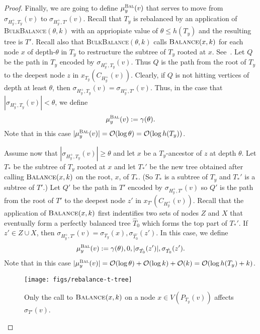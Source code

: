 \documentclass[kpfonts]{patmorin}
\newcommand{\Oh}{\mathcal{O}}
\let\leq\leqslant
\let\geq\geqslant
\begin{document}
\begin{proof}
  Finally, we are going to define $\mu_y^{\textsc{Bal}}(v)$ that serves to move from $\sigma_{H^+_{y},T_{y}}(v)$ to $\sigma_{H^+_{y},T'}(v)$. 
  Recall that $T_y$ is rebalanced by an application of \textsc{BulkBalance}$(\theta,k)$ with an appriopiate value of $\theta \leq h(T_y)$ and the resulting tree is $T'$.
  Recall also that \textsc{BulkBalance}$(\theta,k)$ calls $\textsc{Balance}(x,k)$ for each node $x$ of depth-$\theta$ in $T_y$ to restructure the subtree of $T_y$ rooted at $x$. See~. 
  Let $Q$ be the path in $T_y$ encoded by $\sigma_{H^+_{y},T_{y}}(v)$. 
  Thus $Q$ is the path from the root of $T_y$ to the deepest node $z$ in $x_{T_y}(C_{H^+_{y}}(v))$.
  Clearly, if $Q$ is not hitting vertices of depth at least $\theta$, then $\sigma_{H^+_{y},T_{y}}(v)=\sigma_{H^+_{y},T'}(v)$.
  Thus, in the case that $|\sigma_{H^+_{y},T_{y}}(v)| < \theta$, we define
  \[
  \mu_y^{\textsc{Bal}}(v) := \gamma(\theta).
  \]
  Note that in this case $|\mu_y^{\textsc{Bal}}(v)| = \Oh(\log \theta) = \Oh(\log h(T_y))$.

  Assume now that $|\sigma_{H^+_{y},T_{y}}(v)| \geq \theta$ and let $x$ be a $T_y$-ancestor of $z$ at depth $\theta$. 
  Let $T_*$ be the subtree of $T_y$ rooted at $x$ and let $T_*'$ be the new tree obtained after calling $\textsc{Balance}(x,k)$ on the root, $x$, of $T_*$. (So $T_*$ is a subtree of $T_y$ and $T_*'$ is a subtree of $T'$.)
  Let $Q'$ be the path in $T'$ encoded by $\sigma_{H^+_y,T'}(v)$ so $Q'$ is the path from the root of $T'$ to the deepest node $z'$ in $x_{T'}(C_{H^+_y}(v))$. 
  Recall that the application of $\textsc{Balance}(x,k)$ first indentifies two sets of nodes $Z$ and $X$ that eventually form a perfectly balanced tree $\hat{T}_0$ which forms the top part of $T_*'$. 
  If $z' \in Z\cup X$, then $\sigma_{H^+_y,T'}(v) = \sigma_{T_y}(x),\sigma_{\hat{T_0}}(z')$.
  In this case, we define
  \[
  \mu_y^{\textsc{Bal}}(v) := \gamma(\theta),0,|\sigma_{\hat{T_0}}(z')|,\sigma_{\hat{T_0}}(z').
  \]
  Note that in this case $|\mu_y^{\textsc{Bal}}(v)|=\Oh(\log\theta)+\Oh(\log k) + \Oh(k) = \Oh(\log h(T_y)+k)$.

  \begin{figure}
    \begin{center}
      \texttt{[image: figs/rebalance-t-tree]}
    \end{center}
    \caption{Only the call to $\textsc{Balance}(x,k)$ on a node $x\in V(P_{T_y}(v))$ affects $\sigma_{T'}(v)$.}
  \end{figure}



\end{proof}
\end{document}
